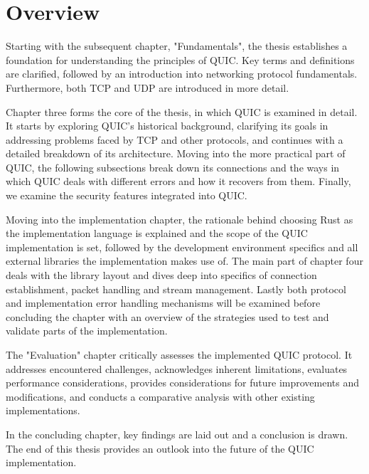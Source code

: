 \section{Overview}

Starting with the subsequent chapter, "Fundamentals", the thesis establishes a foundation for understanding
the principles of QUIC. Key terms and definitions are clarified, followed by an introduction into networking
protocol fundamentals. Furthermore, both TCP and UDP are introduced in more detail.

Chapter three forms the core of the thesis, in which QUIC is examined in detail. It starts by exploring QUIC's
historical background, clarifying its goals in addressing problems faced by TCP and other protocols, and continues
with a detailed breakdown of its architecture. Moving into the more practical part of QUIC, the following
subsections break down its connections and the ways in which QUIC deals with different errors and how it recovers
from them. Finally, we examine the security features integrated into QUIC.

Moving into the implementation chapter, the rationale behind choosing Rust as the implementation
language is explained and the scope of the QUIC implementation is set, followed by the development environment specifics
and all external libraries the implementation makes use of. The main part of chapter four deals with the library layout
and dives deep into specifics of connection establishment, packet handling and stream management. Lastly both protocol
and implementation error handling mechanisms will be examined before concluding the chapter with an overview
of the strategies used to test and validate parts of the implementation.

The "Evaluation" chapter critically assesses the implemented QUIC protocol. It addresses encountered challenges,
acknowledges inherent limitations, evaluates performance considerations, provides considerations for future
improvements and modifications, and conducts a comparative analysis with other existing implementations.

In the concluding chapter, key findings are laid out and a conclusion is drawn. The end of this thesis provides
an outlook into the future of the QUIC implementation.